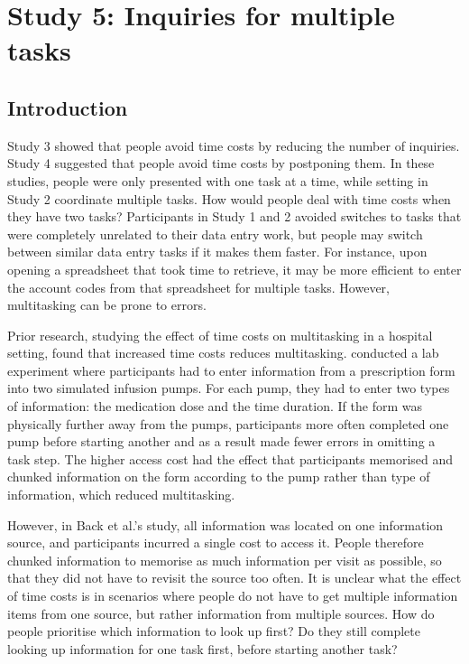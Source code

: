 \section{Study 5: Inquiries for multiple tasks}
 
\subsection{Introduction}
Study 3 showed that people avoid time costs by reducing the number of inquiries. Study 4 suggested that people avoid time costs by postponing them. In these studies, people were only presented with one task at a time, while setting in Study 2 coordinate multiple tasks. How would people deal with time costs when they have two tasks? Participants in Study 1 and 2 avoided switches to tasks that were completely unrelated to their data entry work, but people may switch between similar data entry tasks if it makes them faster. For instance, upon opening a spreadsheet that took time to retrieve, it may be more efficient to enter the account codes from that spreadsheet for multiple tasks. However, multitasking can be prone to errors. 

Prior research, studying the effect of time costs on multitasking in a hospital setting, found that increased time costs reduces multitasking. \citet{Back2012} conducted a lab experiment where participants had to enter information from a prescription form into two simulated infusion pumps. For each pump, they had to enter two types of information: the medication dose and the time duration. If the form was physically further away from the pumps, participants more often completed one pump before starting another and as a result made fewer errors in omitting a task step. The higher access cost had the effect that participants memorised and chunked information on the form according to the pump rather than type of information, which reduced multitasking.

However, in Back et al.'s study, all information was located on one information source, and participants incurred a single cost to access it. People therefore chunked information to memorise as much information per visit as possible, so that they did not have to revisit the source too often. It is unclear what the effect of time costs is in scenarios where people do not have to get multiple information items from one source, but rather information from multiple sources. How do people prioritise which information to look up first? Do they still complete looking up information for one task first, before starting another task?

